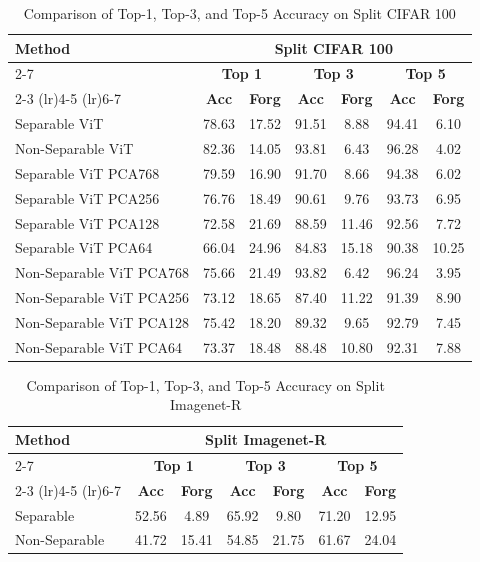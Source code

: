 \begin{table}[h]
	\centering
	\caption{Comparison of Top-1, Top-3, and Top-5 Accuracy on Split CIFAR 100}
	\label{tab:top_n_accuracies}
	\setlength{\tabcolsep}{4pt} %
	\begin{tabular}{lcccccc}
		\toprule
		\multirow{3}{*}{\textbf{Method}} & \multicolumn{6}{c}{\textbf{Split CIFAR 100}} \\
		\cmidrule(lr){2-7}
		& \multicolumn{2}{c}{\textbf{Top 1}} & \multicolumn{2}{c}{\textbf{Top 3}} & \multicolumn{2}{c}{\textbf{Top 5}} \\
		\cmidrule(lr){2-3} \cmidrule(lr){4-5} \cmidrule(lr){6-7}
		& \textbf{Acc} & \textbf{Forg} & \textbf{Acc} & \textbf{Forg} & \textbf{Acc} & \textbf{Forg} \\
		\midrule
		Separable ViT & 78.63 & 17.52 & 91.51 & 8.88 & 94.41 & 6.10 \\
		Non-Separable ViT & 82.36 & 14.05 & 93.81 & 6.43 & 96.28 & 4.02 \\
		\midrule
		Separable ViT PCA768 & 79.59 & 16.90 & 91.70 & 8.66 & 94.38 & 6.02 \\
		Separable ViT PCA256 & 76.76 & 18.49 & 90.61 & 9.76 & 93.73 & 6.95 \\
		Separable ViT PCA128 & 72.58 & 21.69 & 88.59 & 11.46 & 92.56 & 7.72 \\
		Separable ViT PCA64 & 66.04 & 24.96 & 84.83 & 15.18 & 90.38 & 10.25 \\
		\midrule
		Non-Separable ViT PCA768 & 75.66 & 21.49 & 93.82 & 6.42 & 96.24 & 3.95 \\
		Non-Separable ViT PCA256 & 73.12 & 18.65 & 87.40 & 11.22 & 91.39 & 8.90 \\
		Non-Separable ViT PCA128 & 75.42 & 18.20 & 89.32 & 9.65 & 92.79 & 7.45 \\
		Non-Separable ViT PCA64 & 73.37 & 18.48 & 88.48 & 10.80 & 92.31 & 7.88 \\
		\bottomrule
	\end{tabular}
\end{table}

\begin{table}[h]
	\centering
	\caption{Comparison of Top-1, Top-3, and Top-5 Accuracy on Split Imagenet-R}
	\label{tab:top_n_accuracies_imagenet}
	\setlength{\tabcolsep}{4pt} %
	\begin{tabular}{lcccccc}
		\toprule
		\multirow{3}{*}{\textbf{Method}} & \multicolumn{6}{c}{\textbf{Split Imagenet-R}} \\
		\cmidrule(lr){2-7}
		& \multicolumn{2}{c}{\textbf{Top 1}} & \multicolumn{2}{c}{\textbf{Top 3}} & \multicolumn{2}{c}{\textbf{Top 5}} \\
		\cmidrule(lr){2-3} \cmidrule(lr){4-5} \cmidrule(lr){6-7}
		& \textbf{Acc} & \textbf{Forg} & \textbf{Acc} & \textbf{Forg} & \textbf{Acc} & \textbf{Forg} \\
		\midrule
		Separable & 52.56 & 4.89 & 65.92 & 9.80 & 71.20 & 12.95 \\
		Non-Separable & 41.72 & 15.41 & 54.85 & 21.75 & 61.67 & 24.04 \\
		\bottomrule
	\end{tabular}
\end{table}
